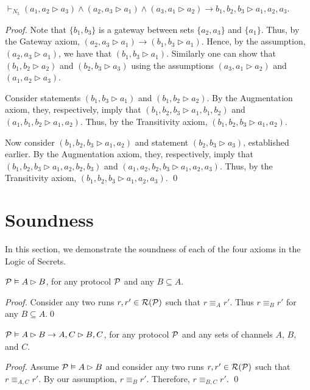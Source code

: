 \documentclass{llncs}
\newcommand{\rr}{{\cal R}}
\newcommand{\pp}{{\cal P}}
\begin{document}
\begin{proposition}\label{}
$\vdash_{N_5}(a_1,a_2\rhd a_3)\wedge(a_2,a_3\rhd a_1)\wedge(a_3,a_1\rhd a_2)\rightarrow b_1,b_2,b_3\rhd a_1,a_2,a_3$.
\end{proposition}
\begin{proof}
Note that $\{b_1,b_3\}$ is a gateway between sets $\{a_2,a_3\}$ and $\{a_1\}$. Thus, by the Gateway axiom,
$(a_2,a_3\rhd a_1)\rightarrow (b_1,b_3\rhd a_1)$. Hence, by the assumption, $(a_2,a_3\rhd a_1)$, we have that $(b_1,b_3\rhd a_1)$. Similarly one
can show that $(b_1,b_2\rhd a_2)$ and $(b_2,b_3\rhd a_3)$ using the assumptions $(a_3,a_1\rhd a_2)$ and $(a_1,a_2\rhd a_3)$.

Consider statements $(b_1,b_3\rhd a_1)$ and $(b_1,b_2\rhd a_2)$. By the Augmentation axiom, they, respectively, imply that
$(b_1,b_2,b_3\rhd a_1,b_1,b_2)$ and $(a_1,b_1,b_2\rhd a_1,a_2)$. Thus, by the Transitivity axiom, $(b_1,b_2,b_3\rhd a_1,a_2)$.

Now consider $(b_1,b_2,b_3\rhd a_1,a_2)$ and statement $(b_2,b_3\rhd a_3)$, established earlier.
By the Augmentation axiom, they, respectively, imply that
$(b_1,b_2,b_3\rhd a_1,a_2,b_2,b_3)$ and $(a_1,a_2,b_2,b_3\rhd a_1,a_2,a_3)$. Thus, by the Transitivity axiom, 
$(b_1,b_2,b_3\rhd a_1,a_2,a_3)$.
\qed
\end{proof}





\section{Soundness}\label{sec:sound}
In this section, we demonstrate the soundness of each of the four axioms in the Logic of Secrets.

\begin{theorem}[Reflexivity]\label{}
$\pp \vDash A\rhd B$, for any protocol $\pp$ and any $B\subseteq A$.
\end{theorem}
\begin{proof}
Consider any two runs $r,r'\in \rr(\pp)$ such that $r\equiv_A r'$. Thus $r\equiv_B r'$ for any $B\subseteq A$.\qed
\end{proof}

\begin{theorem}[Augmentation]\label{}
$\pp \vDash A\rhd B \rightarrow A,C\rhd B,C$, for any protocol $\pp$ and any sets of channels $A$, $B$, and $C$.
\end{theorem}
\begin{proof}
Assume $\pp \vDash A\rhd B$ and consider any two runs $r,r'\in \rr(\pp)$ such that $r\equiv_{A,C}r'$.
By our assumption, $r\equiv_{B}r'$. Therefore, $r\equiv_{B,C}r'$. \qed
\end{proof}
\end{document}
